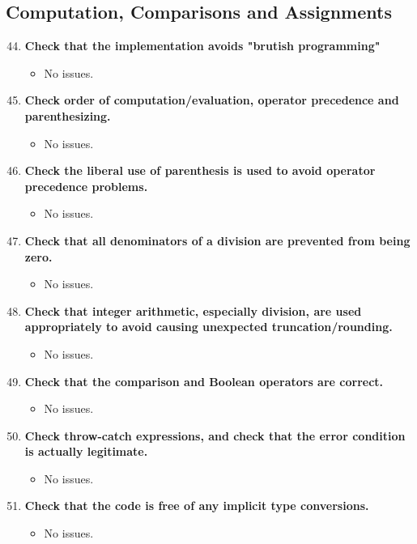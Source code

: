 \documentclass{article}
\begin{document}
		\subsection{Computation, Comparisons and Assignments}
			\begin{enumerate}
				\setcounter{enumi}{43}
				\item \textbf{Check that the implementation avoids "brutish programming"}
				\begin{itemize}
					\item No issues.
				\end{itemize}
				\item \textbf{Check order of computation/evaluation, operator precedence and parenthesizing.}
				\begin{itemize}
					\item No issues.
				\end{itemize}
				\item \textbf{Check the liberal use of parenthesis is used to avoid operator precedence problems.}
				\begin{itemize}
					\item No issues.
				\end{itemize}
				\item \textbf{Check that all denominators of a division are prevented from being zero.}
				\begin{itemize}
					\item No issues.
				\end{itemize}
				\item \textbf{Check that integer arithmetic, especially division, are used appropriately to avoid causing unexpected truncation/rounding.}
				\begin{itemize}
					\item No issues.
				\end{itemize}
				\item \textbf{Check that the comparison and Boolean operators are correct.}
				\begin{itemize}
					\item No issues.
				\end{itemize}
				\item \textbf{Check throw-catch expressions, and check that the error condition is actually legitimate.}
				\begin{itemize}
					\item No issues.
				\end{itemize}
				\item \textbf{Check that the code is free of any implicit type conversions.}
				\begin{itemize}
					\item No issues.
				\end{itemize}
			\end{enumerate}
\end{document}
